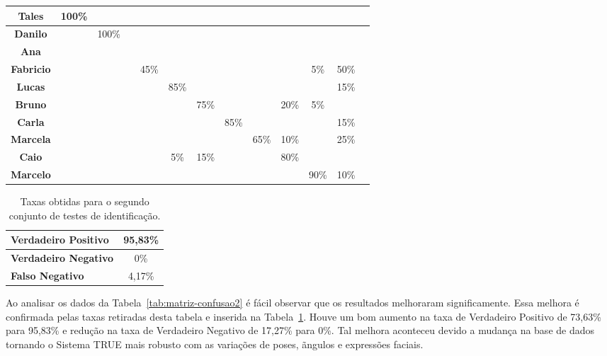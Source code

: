 \begin{table}[htb]
\begin{center}
\begin{tabular}{|c|c|c|c|c|c|c|c|c|c|c|c|c|}
				\hline \bf Tales 			&100\% & 			& 		 & 			&   	 & 			& 		& 		&	 		& 		& 		\\
				\hline \bf Danilo 		& 		 &100\%	& 		 & 			&   	 & 			& 		& 		& 		& 		& 		 		\\
				\hline \bf Ana 				& 		 & 			& 		 & 			&   	 & 			& 		& 		& 		& 		& 		    \\
				\hline \bf Fabricio 	& 		 & 			& 		 &45\%	&      & 			& 		& 		& 		& 5\%	& 50\%    		\\
				\hline \bf Lucas 			& 		 & 			& 		 & 			& 85\% & 			& 		& 		& 		& 		& 15\%		\\
				\hline \bf Bruno 			& 		 & 			& 		 & 			& 		 & 75\% & 	  & 		&20\% & 5\%	& 		  	\\
				\hline \bf Carla 			& 		 & 			& 		 & 			& 		 & 			&85\% &		  & 	  & 		& 15\%		  	\\
				\hline \bf Marcela 		& 		 & 			& 		 & 			& 		 &      & 		&65\% &10\% & 		& 25\%		  	\\
				\hline \bf Caio 		  & 		 & 			& 		 & 			& 	5\%& 	15\%& 		& 		&80\%	&	 		& 		  	\\
				\hline \bf Marcelo 		& 		 & 			& 		 & 			& 		 & 			& 		& 		& 		& 90\%& 10\%		  	\\
				\hline
			\end{tabular}
		\end{center}
	\end{table}

	\begin{table}[htb]
		\begin{center}
			\caption{Taxas obtidas para o segundo conjunto de testes de identificação.}
			\label{tab:taxas2}
			\begin{tabular}{|l|c|}
				\hline \bf Verdadeiro Positivo & 95,83\% \\
				\hline \bf Verdadeiro Negativo & 0\% \\
				\hline \bf Falso Negativo & 4,17\% \\
				\hline
			\end{tabular}
		\end{center}
	\end{table}

	Ao analisar os dados da Tabela~\ref{tab:matriz-confusao2} é fácil observar que os resultados melhoraram significamente. Essa melhora é confirmada pelas taxas retiradas desta tabela e inserida na Tabela~\ref{tab:taxas2}. Houve um bom aumento na taxa de Verdadeiro Positivo de 73,63\% para 95,83\% e redução na taxa de Verdadeiro Negativo de 17,27\% para 0\%. Tal melhora aconteceu devido a mudança na base de dados tornando o Sistema TRUE mais robusto com as variações de poses, ãngulos e expressões faciais.


